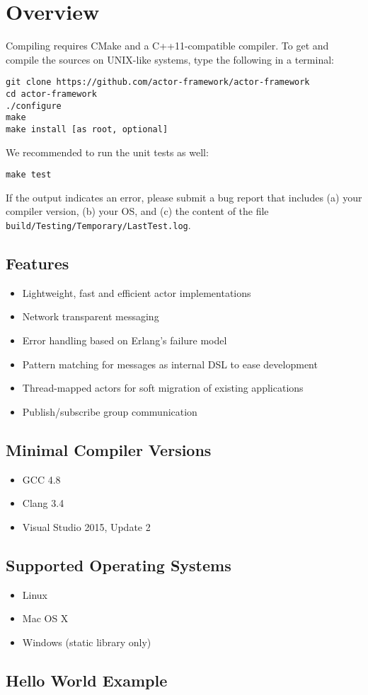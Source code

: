 \section{Overview}

Compiling \lib requires CMake and a C++11-compatible compiler. To get and compile the sources on UNIX-like systems, type the following in a terminal:

\begin{verbatim}
git clone https://github.com/actor-framework/actor-framework
cd actor-framework
./configure
make
make install [as root, optional]
\end{verbatim}

We recommended to run the unit tests as well:

\begin{verbatim}
make test
\end{verbatim}

If the output indicates an error, please submit a bug report that includes (a) your compiler version, (b) your OS, and (c) the content of the file \texttt{build/Testing/Temporary/LastTest.log}.

\subsection{Features}

\begin{itemize}
  \item Lightweight, fast and efficient actor implementations
  \item Network transparent messaging
  \item Error handling based on Erlang's failure model
  \item Pattern matching for messages as internal DSL to ease development
  \item Thread-mapped actors for soft migration of existing applications
  \item Publish/subscribe group communication
\end{itemize}


\subsection{Minimal Compiler Versions}

\begin{itemize}
  \item GCC 4.8
  \item Clang 3.4
  \item Visual Studio 2015, Update 2
\end{itemize}

\subsection{Supported Operating Systems}

\begin{itemize}
\item Linux
\item Mac OS X
\item Windows (static library only)
\end{itemize}

\clearpage
\subsection{Hello World Example}


